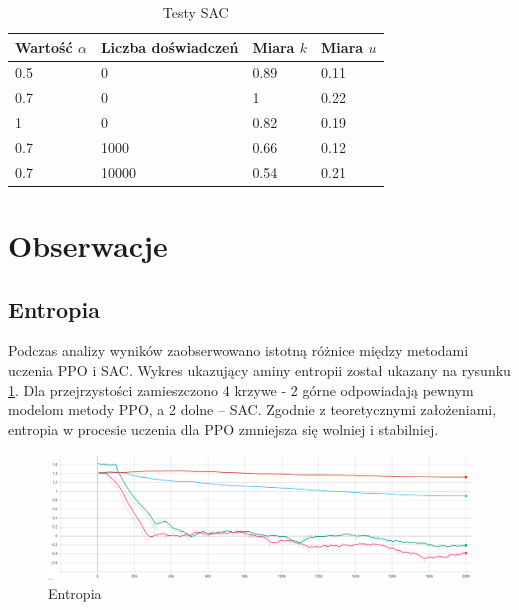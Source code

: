 \documentclass[a4paper,12pt]{article}
\let\oldsection\section
\renewcommand\section{\clearpage\oldsection}
\begin{document}
\begin{table}[H]
	\centering
	\smallskip
	\begin{tabular}{|l|l|l|l|}
		\hline
		Wartość $\alpha$ & Liczba doświadczeń & Miara $k$ & Miara $u$ \\
		\hline
		0.5 & 0 & 0.89 & 0.11 \\		
		0.7 & 0 & 1 & 0.22 \\		
		1 & 0 & 0.82 & 0.19 \\		
		0.7 & 1000 & 0.66 & 0.12 \\	
		0.7 & 10000 & 0.54 & 0.21 \\\hline
	\end{tabular}
	\caption{Testy SAC}
	\label{tab:sac}
\end{table}


\section{Obserwacje}

\subsection{Entropia}
Podczas analizy wyników zaobserwowano istotną różnice między metodami uczenia PPO i SAC. Wykres ukazujący aminy entropii został ukazany na rysunku \ref{pic:entropy}. Dla przejrzystości zamieszczono 4 krzywe - 2 górne odpowiadają pewnym modelom metody PPO, a 2 dolne -- SAC. Zgodnie z teoretycznymi założeniami, entropia w procesie uczenia dla PPO zmniejsza się wolniej i stabilniej. 
\begin{figure}[H]
	\centering
	\includegraphics[width=\textwidth]{entropy}
	\caption{Entropia}
	\label{pic:entropy}
\end{figure}
\end{document}
